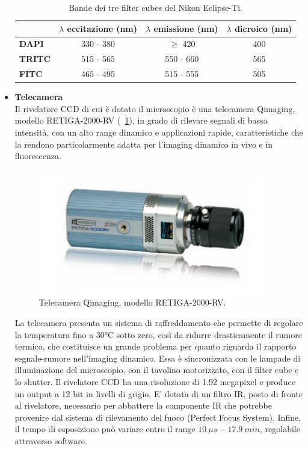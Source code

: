\begin{itemize}
\begin{table}[!ht]
 \begin{center}
\begin{small}
\begin{tabular}{lccc}
\hline\hline
&\textbf{$\lambda$ eccitazione (nm)}&\textbf{$\lambda$ emissione (nm)}&\textbf{$\lambda$ dicroico (nm)}\\
\hline
\textbf{DAPI}&330 - 380&$\geq$ 420&400\\
\textbf{TRITC}&515 - 565&550 - 660&565\\
\textbf{FITC}&465 - 495&515 - 555&505\\
\hline\hline
\end{tabular}
\caption{\small{Bande dei tre filter cubes del Nikon Eclipse-Ti.}}
\label{TAB}
\end{small}
\end{center}
\end{table}

\item \textbf{Telecamera}\\
Il rivelatore CCD di cui è dotato il microscopio è una telecamera Qimaging, modello RETIGA-2000-RV (\figurename~\ref{fig:CCD}), in grado di rilevare segnali di bassa intensità, con un alto range dinamico e applicazioni rapide, caratteristiche che la rendono particolarmente adatta per l'imaging dinamico in vivo e in fluorescenza.

\begin{figure}[!ht]
 \centering
 \includegraphics[scale=.40]{img/CAP2CCD.png}
 \caption{\small{Telecamera Qimaging, modello RETIGA-2000-RV.}}
 \label{fig:CCD}
\end{figure}

La telecamera presenta un sistema di raffreddamento che permette di regolare la temperatura fino a 30°C sotto zero, così da ridurre drasticamente il rumore termico, che costituisce un grande problema per quanto riguarda il rapporto segnale-rumore nell'imaging dinamico. Essa è sincronizzata con le lampade di illuminazione del microscopio, con il tavolino motorizzato, con il filter cube e lo shutter. Il rivelatore CCD ha una risoluzione di 1.92 megapixel e produce un output a 12 bit in livelli di grigio. E' dotata di un filtro IR, posto di fronte al rivelatore, necessario per abbattere la componente IR che potrebbe provenire dal sistema di rilevamento del fuoco (Perfect Focus System). Infine, il tempo di esposizione può variare entro il range $10\ \mu s - 17.9\ min $, regolabile attraverso software.\\


\end{itemize}
